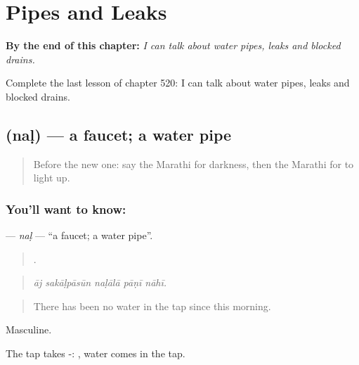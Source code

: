 
\chapter{Pipes and Leaks}
\label{ch:mr-pipes-and-leaks}

\begin{chapteropening}
\textbf{By the end of this chapter:} \emph{I can talk about water pipes, leaks and blocked drains.}

Complete the last lesson of chapter 520: I can talk about water pipes, leaks and blocked drains.
\end{chapteropening}

\section[\texorpdfstring{\mr{नळ} (naḷ)}{नळ (naḷ)}]{ (naḷ) — a faucet; a water pipe}

\label{lesson:MR-C520-nal}



\begin{quote}
Before the new one: say the Marathi for darkness, then the Marathi for to light up.
\end{quote}

\subsection*{You'll want to know: }
\textbf{} — \emph{naḷ} — \textquotedblleft{}a faucet; a water pipe\textquotedblright{}.

\begin{quote}
    .
\end{quote}

\begin{quote}
\emph{āj sakāḷpāsūn naḷālā pāṇī nāhī.}
\end{quote}

\begin{quote}
There has been no water in the tap since this morning.
\end{quote}

Masculine.

The tap takes -:   , water comes in the tap.

